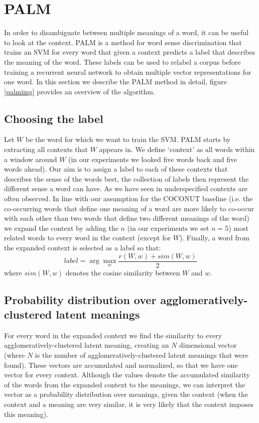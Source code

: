 \documentclass[11pt]{article}
\begin{document}
\section{PALM}
In order to disambiguate between multiple meanings of a word, it can be useful to look at the context. PALM is a method for word sense discrimination that trains an SVM for every word that given a context predicts a label that describes the meaning of the word. These labels can be used to relabel a corpus before training a recurrent neural network to obtain multiple vector representations for one word. In this section we describe the PALM method in detail, figure \ref{palmimg} provides an overview of the algorithm. 

\subsection{Choosing the label}
Let $W$ be the word for which we want to train the SVM. PALM starts by extracting all contexts that $W$ appears in. We define `context' as all words within a window around $W$ (in our experiments we looked five words back and five words ahead). Our aim is to assign a label to each of these contexts that describes the sense of the words best, the collection of labels then represent the different sense a word can have. As we have seen in \cite{analysis} underspecified contexts are often observed. In line with our assumption for the COCONUT baseline (i.e. the co-occurring words that define one meaning of a word are more likely to co-occur with each other than two words that define two different meanings of the word) we expand the context by adding the $n$ (in our experiments we set $n=5$) most related words to every word in the context (except for $W$). Finally, a word from the expanded context is selected as a label so that:
$$label = \arg\max_w \frac{r(W, w) + \textit{sim}(W, w)}{2}$$
where $\textit{sim}(W, w)$ denotes the cosine similarity between $W$ and $w$. 

\subsection{Probability distribution over agglomeratively-clustered latent meanings}
For every word in the expanded context we find the similarity to every agglomeratively-clustered latent meaning, creating an $N$ dimensional vector (where $N$ is the number of agglomeratively-clustered latent meanings that were found). These vectors are accumulated and normalized, so that we have one vector for every context. Although the values denote the accumulated similarity of the words from the expanded context to the meanings, we can interpret the vector as a probability distribution over meanings, given the context (when the context and a meaning are very similar, it is very likely that the context imposes this meaning). 
\end{document}
